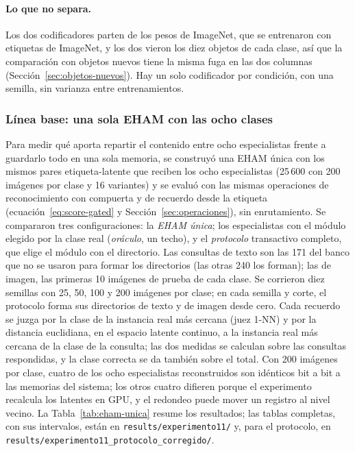 \paragraph{Lo que no separa.}
Los dos codificadores parten de los pesos de ImageNet, que se entrenaron con etiquetas de
ImageNet, y los dos vieron los diez objetos de cada clase, así que la comparación con
objetos nuevos tiene la misma fuga en las dos columnas (Sección~\ref{sec:objetos-nuevos}).
Hay un solo codificador por condición, con una semilla, sin varianza entre
entrenamientos.

\subsubsection{Línea base: una sola EHAM con las ocho clases}
\label{sec:eham-unica}

Para medir qué aporta repartir el contenido entre ocho especialistas frente a guardarlo
todo en una sola memoria, se construyó una EHAM única con los mismos pares etiqueta-latente que reciben los ocho
especialistas (25\,600 con 200 imágenes por clase y 16 variantes) y se evaluó con las
mismas operaciones de reconocimiento con compuerta y de recuerdo desde la etiqueta
(ecuación~\eqref{eq:score-gated} y Sección~\ref{sec:operaciones}), sin enrutamiento.
Se compararon tres configuraciones: la \emph{EHAM única}; los especialistas con el
módulo elegido por la clase real (\emph{oráculo}, un techo), y el \emph{protocolo}
transactivo completo, que elige el módulo con el directorio.
Las consultas de texto son las 171 del banco que no se usaron para formar los
directorios (las otras 240 los forman); las de imagen, las primeras 10 imágenes de
prueba de cada clase.
Se corrieron diez semillas con 25, 50, 100 y 200 imágenes por clase; en cada semilla y
corte, el protocolo forma sus directorios de texto y de imagen desde cero.
Cada recuerdo se juzga por la clase de la instancia real más cercana (juez 1-NN) y por
la distancia euclidiana, en el espacio latente continuo, a la instancia real más
cercana de la clase de la consulta; las dos medidas se calculan sobre las consultas
respondidas, y la clase correcta se da también sobre el total.
Con 200 imágenes por clase, cuatro de los ocho especialistas reconstruidos son idénticos
bit a bit a las memorias del sistema; los otros cuatro difieren porque el experimento
recalcula los latentes en GPU, y el redondeo puede mover un registro al nivel vecino.
La Tabla~\ref{tab:eham-unica} resume los resultados; las tablas completas, con sus
intervalos, están en \texttt{results/experimento11/} y, para el protocolo, en
\texttt{results/experimento11\_protocolo\_corregido/}.

